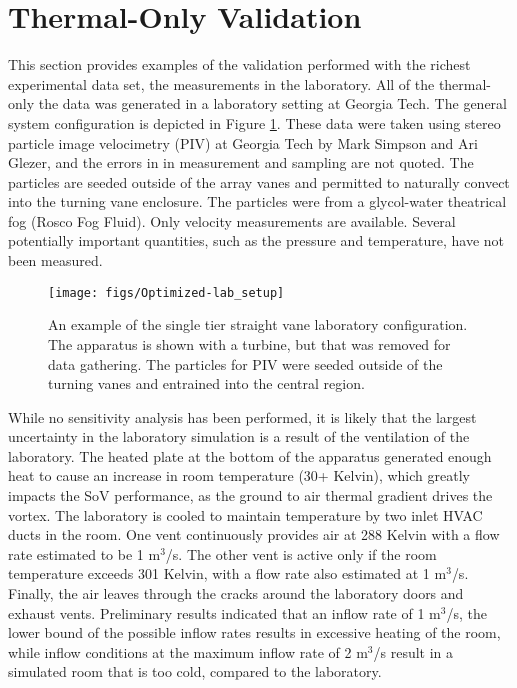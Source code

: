 \section{Thermal-Only Validation}
This section provides examples of the validation performed with the
richest experimental data set, the measurements in the laboratory. All of the
thermal-only the data was generated in a laboratory setting at Georgia
Tech. The general system configuration is depicted in Figure
\ref{fig:lab_image}. These data were taken using stereo particle image
velocimetry (PIV) at Georgia Tech by Mark Simpson and Ari Glezer, and
the errors in in measurement and sampling are 
not quoted. The particles are seeded outside of the array vanes and
permitted to naturally convect into the turning vane enclosure. The
particles were from a glycol-water theatrical fog (Rosco Fog Fluid). 
Only velocity measurements are available. Several
potentially important quantities, such as the pressure and
temperature, have not been measured. 

%
%
 \begin{figure}[!htb]
   \begin{center}
    \texttt{[image: figs/Optimized-lab\_setup]}
    \caption{An example of the single tier straight vane laboratory
    configuration. The apparatus is shown with a turbine, but that was
    removed for data gathering. The particles for PIV were seeded
    outside of the turning vanes and entrained into the central region.}
    \label{fig:lab_image}
   \end{center}
 \end{figure}

While no sensitivity analysis has been performed, it is likely that the
largest uncertainty in the laboratory simulation is a result of the
ventilation of the laboratory. The heated plate at the bottom of the
apparatus generated enough heat to cause an increase in room
temperature (30+ Kelvin), which greatly impacts the SoV
performance, as the ground to air thermal gradient drives the
vortex. The laboratory is cooled to maintain
temperature by two inlet HVAC ducts in the room. 
One vent continuously provides air at 288 Kelvin with a flow rate estimated 
to be 1 $\text{m}^3$/s.
The other vent is active only if the room temperature exceeds 301 Kelvin, 
with a flow rate also estimated at 1 $\text{m}^3$/s\cite{mark_comm}.
Finally, the air leaves through the cracks around the laboratory doors and 
exhaust vents. Preliminary results indicated that an inflow rate of 1
$\text{m}^3$/s, the lower bound of the possible inflow rates results in
excessive heating of the room, while inflow conditions at the maximum
inflow rate of 2 $\text{m}^3$/s result in a simulated room that is too cold,
compared to the laboratory.  

